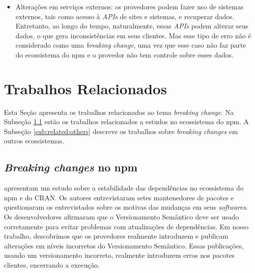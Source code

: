 \begin{itemize}
    \item Alterações em serviços externos: os provedores podem fazer uso de sistemas externos, tais como acesso à \textit{APIs} de sites e sistemas, e recuperar dados. Entretanto, ao longo do tempo, naturalmente, essas \textit{APIs} podem alterar seus dados, o que gera inconsistências em seus clientes. Mas esse tipo de erro não é considerado como uma \textit{breaking change}, uma vez que esse caso não faz parte do ecossistema do \textsf{npm} e o provedor não tem controle sobre esses dados.
\end{itemize}{}

\section{Trabalhos Relacionados}
\label{sec:related_works}
Esta Seção apresenta os trabalhos relacionados ao tema \textit{breaking change}. Na Subseção \ref{sub:related:npm} estão os trabalhos relacionados a estudos no ecossistema do \textsf{npm}. A Subseção \ref{sub:related:others} descreve os trabalhos sobre \textit{breaking changes} em outros ecossistemas.

\subsection{\textit{Breaking changes} no \textsf{npm}}
\label{sub:related:npm}

 apresentam um estudo sobre a estabilidade das dependências no ecossistema do \textsf{npm} e do \textsf{CRAN}. Os autores entrevistaram setes mantenedores de pacotes e questionaram os entrevistados sobre os motivas das mudanças em seus \textit{softwares}. Os desenvolvedores afirmaram que o Versionamento Semântico deve ser usado corretamente para evitar problemas com atualizações de dependências. Em nosso trabalho, descobrimos que os provedores realmente introduzem e publicam alterações em níveis incorretos do Versionamento Semântico. Essas publicações, usando um versionamento incorreto, realmente introduzem erros nos pacotes clientes, encerrando a execução.

